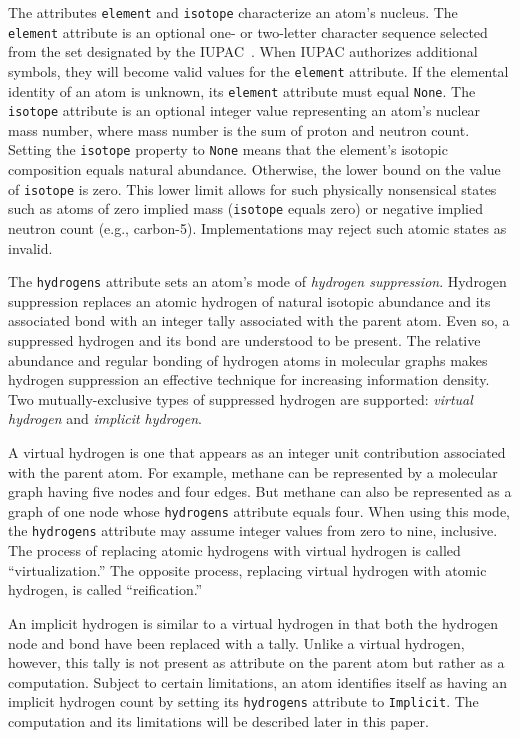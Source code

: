 \documentclass{article}
\def\ttt{\texttt}
\begin{document}
The attributes \ttt{element} and \ttt{isotope} characterize an atom's nucleus. The \ttt{element} attribute is an optional one- or two-letter character sequence selected from the set designated by the IUPAC~\cite{periodicTable}. When IUPAC authorizes additional symbols, they will become valid values for the \ttt{element} attribute. If the elemental identity of an atom is unknown, its \ttt{element} attribute must equal \ttt{None}. The \ttt{isotope} attribute is an optional integer value representing an atom's nuclear mass number, where mass number is the sum of proton and neutron count. Setting the \ttt{isotope} property to \ttt{None} means that the element's isotopic composition equals natural abundance. Otherwise, the lower bound on the value of \ttt{isotope} is zero. This lower limit allows for such physically nonsensical states such as atoms of zero implied mass (\ttt{isotope} equals zero) or negative implied neutron count (e.g., carbon-5). Implementations may reject such atomic states as invalid.

The \ttt{hydrogens} attribute sets an atom's mode of \textit{hydrogen suppression}. Hydrogen suppression replaces an atomic hydrogen of natural isotopic abundance and its associated bond with an integer tally associated with the parent atom. Even so, a suppressed hydrogen and its bond are understood to be present. The relative abundance and regular bonding of hydrogen atoms in molecular graphs makes hydrogen suppression an effective technique for increasing information density. Two mutually-exclusive types of suppressed hydrogen are supported: \textit{virtual hydrogen} and \textit{implicit hydrogen}.

A virtual hydrogen is one that appears as an integer unit contribution associated with the parent atom. For example, methane can be represented by a molecular graph having five nodes and four edges. But methane can also be represented as a graph of one node whose \ttt{hydrogens} attribute equals four. When using this mode, the \ttt{hydrogens} attribute may assume integer values from zero to nine, inclusive. The process of replacing atomic hydrogens with virtual hydrogen is called \enquote{virtualization.} The opposite process, replacing virtual hydrogen with atomic hydrogen, is called \enquote{reification.}

An implicit hydrogen is similar to a virtual hydrogen in that both the hydrogen node and bond have been replaced with a tally. Unlike a virtual hydrogen, however, this tally is not present as attribute on the parent atom but rather as a computation. Subject to certain limitations, an atom identifies itself as having an implicit hydrogen count by setting its \ttt{hydrogens} attribute to \ttt{Implicit}. The computation and its limitations will be described later in this paper.
\end{document}
